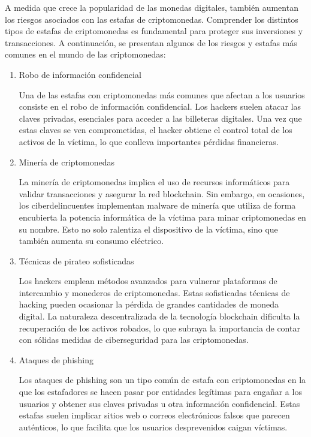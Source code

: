 \documentclass[12pt,a4paper]{article}
\begin{document}
A medida que crece la popularidad de las monedas digitales, también aumentan los riesgos asociados con las estafas de criptomonedas. Comprender los distintos tipos de estafas de criptomonedas es fundamental para proteger sus inversiones y transacciones. A continuación, se presentan algunos de los riesgos y estafas más comunes en el mundo de las criptomonedas:

\begin{enumerate}[label=\alph*.]
  \item Robo de información confidencial

Una de las estafas con criptomonedas más comunes que afectan a los usuarios consiste en el robo de información confidencial. Los hackers suelen atacar las claves privadas, esenciales para acceder a las billeteras digitales. Una vez que estas claves se ven comprometidas, el hacker obtiene el control total de los activos de la víctima, lo que conlleva importantes pérdidas financieras.

  \item Minería de criptomonedas

La minería de criptomonedas implica el uso de recursos informáticos para validar transacciones y asegurar la red blockchain. Sin embargo, en ocasiones, los ciberdelincuentes implementan malware de minería que utiliza de forma encubierta la potencia informática de la víctima para minar criptomonedas en su nombre. Esto no solo ralentiza el dispositivo de la víctima, sino que también aumenta su consumo eléctrico.

  \item Técnicas de pirateo sofisticadas

Los hackers emplean métodos avanzados para vulnerar plataformas de intercambio y monederos de criptomonedas. Estas sofisticadas técnicas de hacking pueden ocasionar la pérdida de grandes cantidades de moneda digital. La naturaleza descentralizada de la tecnología blockchain dificulta la recuperación de los activos robados, lo que subraya la importancia de contar con sólidas medidas de ciberseguridad para las criptomonedas.

  \item Ataques de phishing

Los ataques de phishing son un tipo común de estafa con criptomonedas en la que los estafadores se hacen pasar por entidades legítimas para engañar a los usuarios y obtener sus claves privadas u otra información confidencial. Estas estafas suelen implicar sitios web o correos electrónicos falsos que parecen auténticos, lo que facilita que los usuarios desprevenidos caigan víctimas.
\end{enumerate}
\end{document}
